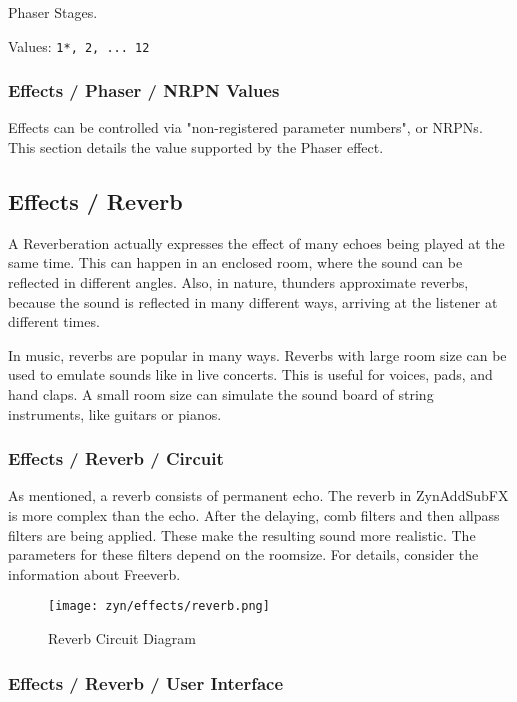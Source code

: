    Phaser Stages.

   Values: \texttt{1*, 2, ... 12}

\subsubsection{Effects / Phaser / NRPN Values}
\label{subsubsec:effects_edit_phaser_nrpn}

Effects can be controlled via "non-registered parameter numbers", or NRPNs.
This section details the value supported by the Phaser effect.

\subsection{Effects / Reverb}
\label{subsec:effects_edit_reverb}

   A Reverberation actually expresses the effect of many echoes being played
   at the same time. This can happen in an enclosed room, where the sound can
   be reflected in different angles. Also, in nature, thunders approximate
   reverbs, because the sound is reflected in many different ways, arriving
   at the listener at different times.

   In music, reverbs are popular in many ways. Reverbs with large room size
   can be used to emulate sounds like in live concerts. This is useful for
   voices, pads, and hand claps. A small room size can simulate the sound
   board of string instruments, like guitars or pianos.

\subsubsection{Effects / Reverb / Circuit}
\label{subsubsec:effects_edit_reverb_circuit}

   As mentioned, a reverb consists of permanent echo. The reverb in
   ZynAddSubFX is more complex than the echo. After the delaying, comb
   filters and then allpass filters are being applied. These make the
   resulting sound more realistic. The parameters for these filters depend on
   the roomsize. For details, consider the information about Freeverb.

\begin{figure}[H]
   \centering
   \texttt{[image: zyn/effects/reverb.png]}
   \caption{Reverb Circuit Diagram}
   \label{fig:reverb_circuit_diagram}
\end{figure}

\subsubsection{Effects / Reverb / User Interface}
\label{subsubsec:effects_edit_reverb_ui}

